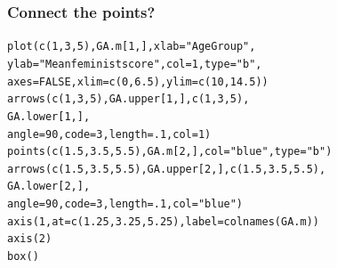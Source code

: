 \documentclass{beamer}\usepackage[]{graphicx}\usepackage[]{color}
\makeatletter
\newcommand{\hlnum}[1]{\textcolor[rgb]{0.533,0,0.133}{#1}}%
\newcommand{\hlstr}[1]{\textcolor[rgb]{0.667,0.267,0}{#1}}%
\newcommand{\hlstd}[1]{\textcolor[rgb]{0,0,0}{#1}}%
\newcommand{\hlkwc}[1]{\textcolor[rgb]{0,0,0.4}{#1}}%
\newcommand{\hlkwd}[1]{\textcolor[rgb]{0,0.267,0.4}{#1}}%
\newenvironment{kframe}{%
 \def\at@end@of@kframe{}%
 \ifinner\ifhmode%
  \def\at@end@of@kframe{\end{minipage}}%
  \begin{minipage}{\columnwidth}%
 \fi\fi%
 \def\FrameCommand##1{\hskip\@totalleftmargin \hskip-\fboxsep
 \colorbox{shadecolor}{##1}\hskip-\fboxsep
     \hskip-\linewidth \hskip-\@totalleftmargin \hskip\columnwidth}%
 \MakeFramed {\advance\hsize-\width
   \@totalleftmargin\z@ \linewidth\hsize
   \@setminipage}}%
 {\par\unskip\endMakeFramed%
 \at@end@of@kframe}
\newenvironment{knitrout}{}{} %
\makeatother
\begin{document}
\begin{frame}[fragile]
  \frametitle{Connect the points?}
\begin{knitrout}
\color{fgcolor}\begin{kframe}
\begin{alltt}
\hlkwd{plot}\hlstd{(}\hlkwd{c}\hlstd{(}\hlnum{1}\hlstd{,} \hlnum{3}\hlstd{,} \hlnum{5}\hlstd{), GA.m[}\hlnum{1}\hlstd{, ],} \hlkwc{xlab} \hlstd{=} \hlstr{"Age Group"}\hlstd{,}
     \hlkwc{ylab} \hlstd{=} \hlstr{"Mean feminist score"}\hlstd{,}\hlkwc{col} \hlstd{=} \hlnum{1}\hlstd{,} \hlkwc{type} \hlstd{=} \hlstr{"b"}\hlstd{,}
     \hlkwc{axes} \hlstd{=} \hlnum{FALSE}\hlstd{,} \hlkwc{xlim} \hlstd{=} \hlkwd{c}\hlstd{(}\hlnum{0}\hlstd{,} \hlnum{6.5}\hlstd{),} \hlkwc{ylim} \hlstd{=} \hlkwd{c}\hlstd{(}\hlnum{10}\hlstd{,} \hlnum{14.5}\hlstd{))}
\hlkwd{arrows}\hlstd{(}\hlkwd{c}\hlstd{(}\hlnum{1}\hlstd{,} \hlnum{3}\hlstd{,} \hlnum{5}\hlstd{), GA.upper[}\hlnum{1}\hlstd{, ],} \hlkwd{c}\hlstd{(}\hlnum{1}\hlstd{,} \hlnum{3}\hlstd{,} \hlnum{5}\hlstd{),}
       \hlstd{GA.lower[}\hlnum{1}\hlstd{, ],}
       \hlkwc{angle} \hlstd{=} \hlnum{90}\hlstd{,} \hlkwc{code} \hlstd{=} \hlnum{3}\hlstd{,} \hlkwc{length} \hlstd{=} \hlnum{.1}\hlstd{,} \hlkwc{col} \hlstd{=} \hlnum{1}\hlstd{)}
\hlkwd{points}\hlstd{(}\hlkwd{c}\hlstd{(}\hlnum{1.5}\hlstd{,} \hlnum{3.5}\hlstd{,} \hlnum{5.5}\hlstd{),GA.m[}\hlnum{2}\hlstd{, ],} \hlkwc{col} \hlstd{=} \hlstr{"blue"}\hlstd{,} \hlkwc{type} \hlstd{=} \hlstr{"b"}\hlstd{)}
\hlkwd{arrows}\hlstd{(}\hlkwd{c}\hlstd{(}\hlnum{1.5}\hlstd{,} \hlnum{3.5}\hlstd{,} \hlnum{5.5}\hlstd{), GA.upper[}\hlnum{2}\hlstd{, ],} \hlkwd{c}\hlstd{(}\hlnum{1.5}\hlstd{,} \hlnum{3.5}\hlstd{,} \hlnum{5.5}\hlstd{),}
       \hlstd{GA.lower[}\hlnum{2}\hlstd{, ],}
       \hlkwc{angle} \hlstd{=} \hlnum{90}\hlstd{,} \hlkwc{code} \hlstd{=} \hlnum{3}\hlstd{,} \hlkwc{length} \hlstd{=} \hlnum{.1}\hlstd{,} \hlkwc{col} \hlstd{=} \hlstr{"blue"}\hlstd{)}
\hlkwd{axis}\hlstd{(}\hlnum{1}\hlstd{,} \hlkwc{at} \hlstd{=} \hlkwd{c}\hlstd{(}\hlnum{1.25}\hlstd{,} \hlnum{3.25}\hlstd{,} \hlnum{5.25}\hlstd{),} \hlkwc{label} \hlstd{=} \hlkwd{colnames}\hlstd{(GA.m))}
\hlkwd{axis}\hlstd{(}\hlnum{2}\hlstd{)}
\hlkwd{box}\hlstd{()}
\end{alltt}
\end{kframe}
\end{knitrout}
\end{frame} 
\end{document}
